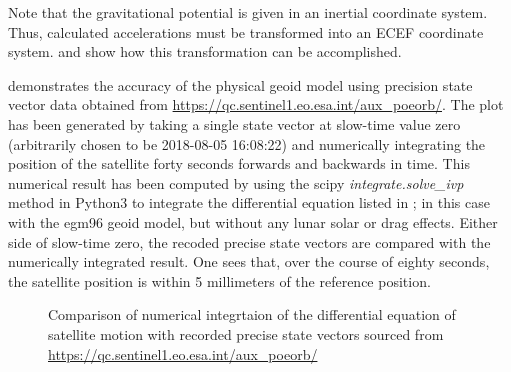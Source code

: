 \par
Note that the gravitational potential is given in an inertial coordinate system. Thus, calculated accelerations must be transformed into an ECEF coordinate system.  and \cite{Shou2014} show how this transformation can be accomplished. 
\par
{} demonstrates the accuracy of the physical geoid model using precision state vector data obtained from \url{https://qc.sentinel1.eo.esa.int/aux\_poeorb/}. The plot has been generated by taking a single state vector at slow-time value zero (arbitrarily chosen to be 2018-08-05 16:08:22) and numerically integrating the position of the satellite forty seconds forwards and backwards in time. This numerical result has been computed by using the scipy {\em integrate.solve\_ivp} method in Python3 to integrate the differential equation listed in \cite{Shou2014}; in this case with the egm96 geoid model, but without any lunar solar or drag effects. Either side of slow-time zero, the recoded precise state vectors are compared with the numerically integrated result. One sees that, over the course of eighty seconds, the satellite position is within 5 millimeters of the reference position.
\begin{figure}
    \resizebox{\textwidth}{!}{}
	\caption{Comparison of numerical integrtaion of the differential equation of satellite motion with recorded precise state vectors sourced from \url{https://qc.sentinel1.eo.esa.int/aux\_poeorb/}}
	\label{fg:GeoidPreciseState}
\end{figure}

